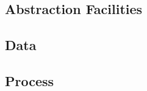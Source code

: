 
\begin{flushleft}
\section{Abstraction Facilities}

\end{flushleft}

\subsection{Data}

\subsection{Process}
